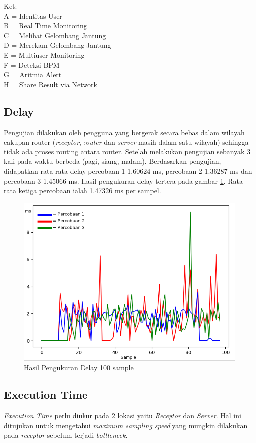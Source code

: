 Ket: \\
A = Identitas User \\
B = Real Time Monitoring \\
C = Melihat Gelombang Jantung \\
D = Merekam Gelombang Jantung \\
E = Multiuser Monitoring \\
F = Deteksi BPM \\
G = Aritmia Alert \\
H = Share Result via Network\\

\subsection{Delay}
Pengujian dilakukan oleh pengguna yang bergerak secara bebas dalam wilayah cakupan router (\textit{receptor}, \textit{router} dan \textit{server} masih dalam satu wilayah) sehingga tidak ada proses routing antara router. Setelah melakukan pengujian sebanyak 3 kali pada waktu berbeda (pagi, siang, malam). Berdasarkan pengujian, didapatkan rata-rata delay percobaan-1 1.60624 ms, percobaan-2 1.36287 ms dan percobaan-3 1.45066 ms. Hasil pengukuran delay tertera pada gambar \ref{fig:delay}. Rata-rata ketiga percobaan ialah 1.47326 ms per sampel.

\begin{figure}[H]
	\centering
	\includegraphics[scale=0.5]{images/delay1.png}
	\caption{Hasil Pengukuran Delay 100 sample}
	\label{fig:delay}
\end{figure}

\subsection{Execution Time}
\textit{Execution Time} perlu diukur pada 2 lokasi yaitu \textit{Receptor} dan \textit{Server}. Hal ini ditujukan untuk mengetahui \textit{maximum sampling speed} yang mungkin dilakukan pada \textit{receptor} sebelum terjadi \textit{bottleneck}. 

